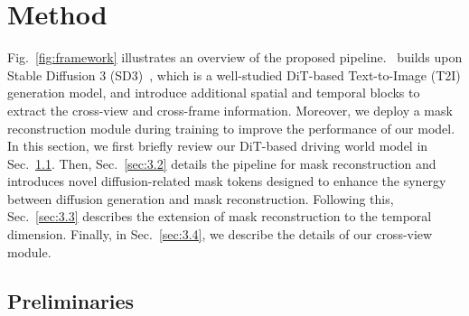 \section{Method}

Fig.~\ref{fig:framework} illustrates an overview of the proposed pipeline.
\ourmethod~builds upon Stable Diffusion 3 (SD3)~\cite{sd3}, which is a well-studied  DiT-based Text-to-Image (T2I) generation model, and introduce additional spatial and temporal blocks to extract the cross-view and cross-frame information. Moreover, we deploy a mask reconstruction module during training to improve the performance of our model. In this section, we first briefly review our DiT-based driving world model in Sec.~\ref{sec:3.1}. Then, Sec.~\ref{sec:3.2} details the pipeline for mask reconstruction and introduces novel diffusion-related mask tokens designed to enhance the synergy between diffusion generation and mask reconstruction. Following this, Sec.~\ref{sec:3.3} describes the extension of mask reconstruction to the temporal dimension. Finally, in Sec.~\ref{sec:3.4}, we describe the details of our cross-view module. 
\subsection{Preliminaries}
\label{sec:3.1}


